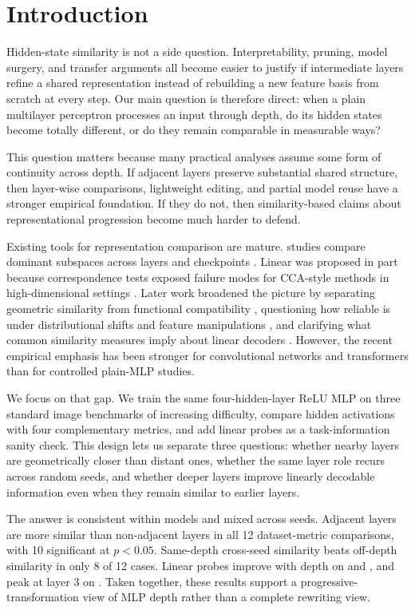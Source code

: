 \section{Introduction}
\label{sec:introduction}

Hidden-state similarity is not a side question. Interpretability, pruning, model surgery, and transfer arguments all become easier to justify if intermediate layers refine a shared representation instead of rebuilding a new feature basis from scratch at every step. Our main question is therefore direct: when a plain multilayer perceptron processes an input through depth, do its hidden states become totally different, or do they remain comparable in measurable ways?

This question matters because many practical analyses assume some form of continuity across depth. If adjacent layers preserve substantial shared structure, then layer-wise comparisons, lightweight editing, and partial model reuse have a stronger empirical foundation. If they do not, then similarity-based claims about representational progression become much harder to defend.

Existing tools for representation comparison are mature. \svcca studies compare dominant subspaces across layers and checkpoints \cite{raghu2017svcca}. Linear \cka was proposed in part because correspondence tests exposed failure modes for CCA-style methods in high-dimensional settings \cite{kornblith2019similarity}. Later work broadened the picture by separating geometric similarity from functional compatibility \cite{csiszarik2021similarity}, questioning how reliable \cka is under distributional shifts and feature manipulations \cite{davari2023reliability}, and clarifying what common similarity measures imply about linear decoders \cite{harvey2024decodable}. However, the recent empirical emphasis has been stronger for convolutional networks and transformers than for controlled plain-MLP studies.

We focus on that gap. We train the same four-hidden-layer ReLU MLP on three standard image benchmarks of increasing difficulty, compare hidden activations with four complementary metrics, and add linear probes as a task-information sanity check. This design lets us separate three questions: whether nearby layers are geometrically closer than distant ones, whether the same layer role recurs across random seeds, and whether deeper layers improve linearly decodable information even when they remain similar to earlier layers.

 The answer is consistent within models and mixed across seeds. Adjacent layers are more similar than non-adjacent layers in all 12 dataset-metric comparisons, with 10 significant at $p<0.05$. Same-depth cross-seed similarity beats off-depth similarity in only 8 of 12 cases. Linear probes improve with depth on \mnist and \fashionmnist, and peak at layer 3 on \cifar. Taken together, these results support a progressive-transformation view of MLP depth rather than a complete rewriting view.

